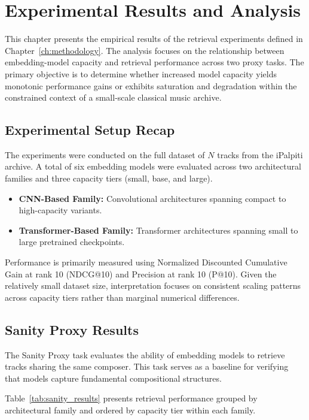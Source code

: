 \chapter{Experimental Results and Analysis}\label{ch:results}

This chapter presents the empirical results of the retrieval experiments defined in Chapter~\ref{ch:methodology}. The analysis focuses on the relationship between embedding-model capacity and retrieval performance across two proxy tasks. The primary objective is to determine whether increased model capacity yields monotonic performance gains or exhibits saturation and degradation within the constrained context of a small-scale classical music archive.

\section{Experimental Setup Recap}

The experiments were conducted on the full dataset of $N$ tracks from the iPalpiti archive. 
A total of six embedding models were evaluated across two architectural families and three capacity tiers (small, base, and large).

\begin{itemize}
    \item \textbf{CNN-Based Family:} Convolutional architectures spanning compact to high-capacity variants.
    \item \textbf{Transformer-Based Family:} Transformer architectures spanning small to large pretrained checkpoints.
\end{itemize}

Performance is primarily measured using Normalized Discounted Cumulative Gain at rank 10 (NDCG@10) and Precision at rank 10 (P@10). 
Given the relatively small dataset size, interpretation focuses on consistent scaling patterns across capacity tiers rather than marginal numerical differences.


\section{Sanity Proxy Results}

The Sanity Proxy task evaluates the ability of embedding models to retrieve tracks sharing the same composer. This task serves as a baseline for verifying that models capture fundamental compositional structures.

Table~\ref{tab:sanity_results} presents retrieval performance grouped by architectural family and ordered by capacity tier within each family.

